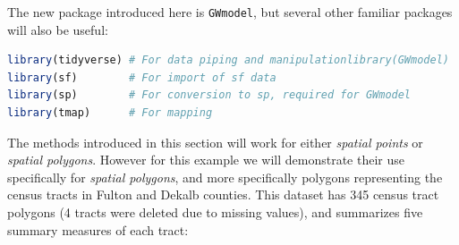 \documentclass[
]{book}
\newcommand{\passthrough}[1]{#1}
\begin{document}
The new package introduced here is \passthrough{\lstinline!GWmodel!}, but several other familiar packages will also be useful:

\begin{lstlisting}[language=R]
library(tidyverse) # For data piping and manipulationlibrary(GWmodel)   # Has the function gwss() 
library(sf)        # For import of sf data
library(sp)        # For conversion to sp, required for GWmodel
library(tmap)      # For mapping
\end{lstlisting}

The methods introduced in this section will work for either \emph{spatial points} or \emph{spatial polygons}. However for this example we will demonstrate their use specifically for \emph{spatial polygons}, and more specifically polygons representing the census tracts in Fulton and Dekalb counties. This dataset has 345 census tract polygons (4 tracts were deleted due to missing values), and summarizes five summary measures of each tract:
\end{document}
